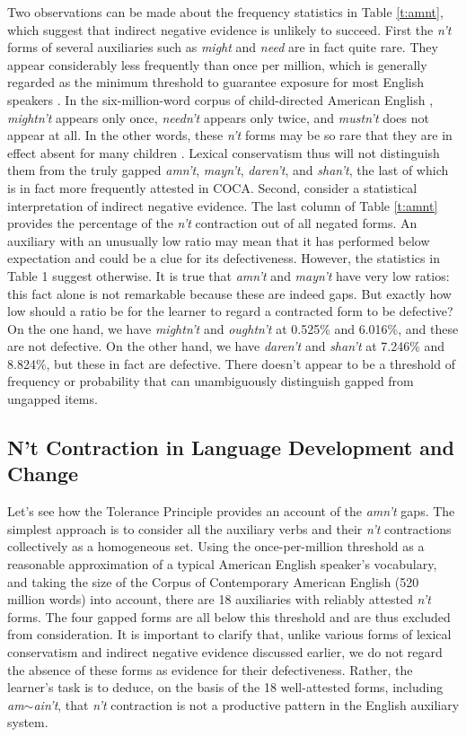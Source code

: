 \documentclass[output=paper,
modfonts
]{LSP/langsci}
\begin{document}
Two observations can be made about the frequency statistics in Table
\ref{t:amnt}, which suggest that  indirect negative evidence is unlikely to
succeed.   First  the \textit{  n't} forms of several auxiliaries such as \textit{might} and \textit{need} are in fact quite rare. They appear
considerably less frequently than  once per million,  which is
generally regarded as the minimum  
threshold to guarantee exposure for most English speakers
\citep{Nagy1984}. In the  six-million-word corpus of child-directed
American English \citep{CHILDES}, \textit{mightn't} appears only once,
\textit{needn't} appears only twice, and \textit{
  mustn't} does not appear at all. In the other words, these \textit{n't}
forms may be so rare 
that they are in effect absent for many children
\citep{Hart1995}. Lexical conservatism thus will not 
distinguish them 
from the truly gapped \textit{amn't}, \textit{mayn't}, \textit{daren't}, and \textit{shan't}, the last of which is in fact more
frequently attested in COCA. Second, consider a statistical interpretation of
indirect negative evidence. The last column of Table
\ref{t:amnt} provides the percentage of the 
\textit{n't} contraction out of all negated forms. 
An auxiliary with  an unusually low
ratio may mean  that it has performed below expectation and 
could be a clue for its defectiveness. However, the statistics in Table
1 suggest otherwise. It is true that \textit{amn't} and \textit{mayn't} have very low ratios:  this fact alone is not remarkable
because these are indeed gaps. But exactly how low should a
ratio be for the learner to regard a contracted form to be
defective? On the one hand, we have \textit{mightn't} and \textit{oughtn't}
at 0.525\% and 6.016\%, and these are not defective. On the
other hand, we have \textit{
  daren't} and \textit{shan't} at 7.246\% and 8.824\%, but these in fact are
 defective.  There doesn't appear to
be a threshold of frequency or probability that can unambiguously
distinguish gapped from ungapped items. 

\subsection{ N't Contraction in Language Development and Change}
Let's see how the Tolerance Principle provides an account of the \textit{amn't} gaps. The simplest approach is to consider all the auxiliary verbs
and their \textit{n't} contractions collectively as  a homogeneous set. Using the
once-per-million threshold as a reasonable approximation of a typical
American English speaker's vocabulary, and taking the size of the
Corpus of Contemporary American English (520 million words) into account, there are
18 auxiliaries with reliably attested \textit{n't} forms. The four
gapped forms are all below this threshold and are thus excluded from
consideration. It is important to 
clarify that, unlike various forms of lexical conservatism and
indirect negative evidence discussed earlier, we do 
not regard the absence of these forms as evidence for their
defectiveness. Rather, the learner's task is  to deduce, on the
basis of the 18 well-attested forms, including \textit{am}$\sim$\textit{ain't},
that  \textit{n't} contraction is 
not a productive pattern in the English auxiliary system. 
\end{document}
